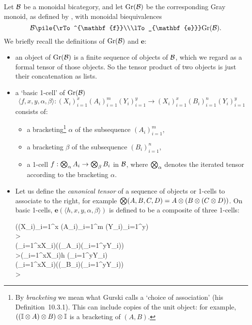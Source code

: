 \documentclass{robinthesisdraft}
\begin{document}
\newcommand\ee{\mathbf{e}}
\newcommand\ff{\mathbf{f}}
Let $\mathcal{B}$ be a monoidal bicategory, and let $\mathrm{Gr}(\mathcal{B})$ be the
corresponding Gray monoid, as defined by \citet[][Chapter~10]{GurskiThesis},
with monoidal biequivalences
\[
	\B \pile{\rTo^{\ff}\\\lTo_{\ee}} \Gr(\B).
\]
We briefly recall the definitions of $\mathrm{Gr}(\mathcal{B})$ and $\ee$:
\begin{itemize}
	\item an object of $\mathrm{Gr}(\mathcal{B})$ is a finite sequence of objects of $\mathcal{B}$,
		which we regard as a formal tensor of those objects. So the tensor
		product of two objects is just their concatenation as lists.
	\item a `basic 1-cell' of $\mathrm{Gr}(\mathcal{B})$
	\[
		\langle f,x,y,\alpha,\beta \rangle:
		(X_{i})_{i=1}^{x} (A_{i})_{i=1}^{m} (Y_{i})_{i=1}^{y}
		\to
		(X_{i})_{i=1}^{x} (B_{i})_{i=1}^{n} (Y_{i})_{i=1}^{y}
	\]
	consists of:
	\begin{itemize}
		\item a bracketing\footnote{
			By \emph{bracketing} we mean what Gurski calls a `choice of association'
			(his Definition~10.3.1). This can include copies of the unit object:
			for example, $((\I\tn A)\tn B)\tn \I$ is a bracketing of $(A,B)$.
		} $\alpha$ of the subsequence $(A_{i})_{i=1}^{m}$,
		\item a bracketing $\beta$ of the subsequence $(B_{i})_{i=1}^{n}$,
		\item a 1-cell $f: \bigotimes_{\alpha}A_{i} \to \bigotimes_{\beta}B_{i}$ in $\mathcal{B}$,
			where $\bigotimes_{\alpha}$ denotes the iterated tensor according to the
			bracketing $\alpha$.
	\end{itemize}
	\item Let us define the \emph{canonical tensor} of a sequence of objects or 1-cells to
	associate to the right, for example $\Tn(A,B,C,D) = A\tn(B\tn(C\tn D))$.
	On basic 1-cells, $\ee(\langle h,x,y,\alpha,\beta \rangle)$ is defined to
		be a composite of three 1-cells:
		\begin{diagram}
			\Tn((X_{i})_{i=1}^{x} (A_{i})_{i=1}^{m} (Y_{i})_{i=1}^{y}) \\
			\dTo>{\cong} \\
			(\Tn_{i=1}^{x}X_{i})\tn\bigl((\Tn_{\alpha}A_{i})\tn(\Tn_{i=1}^{y}Y_{i})\bigr) \\
			\dTo>{(\Tn_{i=1}^{x}X_{i})\tn h \tn(\Tn_{i=1}^{y}Y_{i})} \\
			(\Tn_{i=1}^{x}X_{i})\tn\bigl((\Tn_{\beta}B_{i})\tn(\Tn_{i=1}^{y}Y_{i})\bigr) \\
			\dTo>{\cong} \\

\end{diagram}
\end{itemize}
\end{document}

